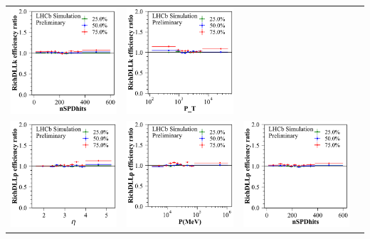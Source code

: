 \documentclass[oneside]{book}
\begin{document}
\begin{tabular}{l@{\hskip -0.0in}c@{\hskip -0.0in}c@{\hskip -0.0in}c}
\includegraphics[width=0.32\linewidth]{eff_ratio_RichDLLk_vs_nSPDhits_at_[0.05, 0.1, 0.25, 0.5, 0.75, 0.9, 0.95].pdf}  &
\includegraphics[width=0.32\linewidth]{eff_ratio_RichDLLk_vs_P_T_at_[0.05, 0.1, 0.25, 0.5, 0.75, 0.9, 0.95].pdf}\\
\vspace{-0.2cm}
\includegraphics[width=0.32\linewidth]{eff_ratio_RichDLLp_vs_Brunel_ETA_at_[0.05, 0.1, 0.25, 0.5, 0.75, 0.9, 0.95].pdf} &
\includegraphics[width=0.32\linewidth]{eff_ratio_RichDLLp_vs_Brunel_P_at_[0.05, 0.1, 0.25, 0.5, 0.75, 0.9, 0.95].pdf} &
\includegraphics[width=0.32\linewidth]{eff_ratio_RichDLLp_vs_nSPDhits_at_[0.05, 0.1, 0.25, 0.5, 0.75, 0.9, 0.95].pdf}  &

\end{tabular}
\end{document}
